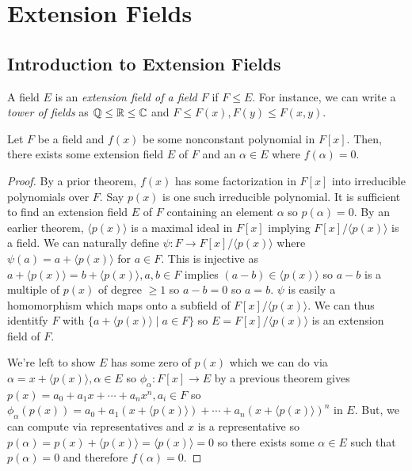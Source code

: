 \chapter{Extension Fields}

\section{Introduction to Extension Fields}

\begin{definition}
    A field $E$ is an \emph{extension field of a field $F$} if $F \leq E.$ For instance, we can write a \emph{tower of fields} as $\mathbb{Q} \leq \mathbb{R} \leq \mathbb{C}$ and $F \leq F(x), F(y) \leq F(x,y).$
\end{definition}
\begin{theorem}
    Let $F$ be a field and $f(x)$ be some nonconstant polynomial in $F[x].$ Then, there exists some extension field $E$ of $F$ and an $\alpha \in E$ where $f(\alpha) = 0$.
\end{theorem}
\begin{proof}
    By a prior theorem, $f(x)$ has some factorization in $F[x]$ into irreducible polynomials over $F.$ Say $p(x)$ is one such irreducible polynomial. It is sufficient to find an extension field $E$ of $F$ containing an element $\alpha$ so $p(\alpha) = 0.$ By an earlier theorem, $\langle p(x) \rangle$ is a maximal ideal in $F[x]$ implying $F[x]/\langle p(x) \rangle$ is a field. We can naturally define $\psi \colon F \to F[x]/\langle p(x) \rangle$ where $\psi(a) = a + \langle p(x) \rangle$ for $a \in F$. This is injective as $a + \langle p(x) \rangle = b + \langle p(x) \rangle, a,b \in F$ implies $(a-b) \in \langle p(x) \rangle$ so $a-b$ is a multiple of $p(x)$ of degree $\geq 1$ so $a - b = 0$ so $a = b.$ $\psi$ is easily a homomorphism which maps onto a subfield of $F[x]/\langle p(x) \rangle.$ We can thus identitfy $F$ with $\{a + \langle p(x) \rangle \mid a \in F\}$ so $E = F[x]/\langle p(x) \rangle$ is an extension field of $F$. 
    
    We're left to show $E$ has some zero of $p(x)$ which we can do via $\alpha = x + \langle p(x) \rangle, \alpha \in E$ so $\phi_\alpha\colon F[x] \to E$ by a previous theorem gives $p(x) = a_0 + a_1x + \cdots + a_nx^n, a_i \in F$ so $\phi_\alpha(p(x)) = a_0 + a_1(x + \langle p(x) \rangle) + \cdots + a_n(x + \langle p(x) \rangle)^n$ in $E$. But, we can compute via representatives and $x$ is a representative so $p(\alpha) = p(x) + \langle p(x) \rangle = \langle p(x) \rangle = 0$ so there exists some $\alpha \in E$ such that $p(\alpha) = 0$ and therefore $f(\alpha) = 0.$
\end{proof}

